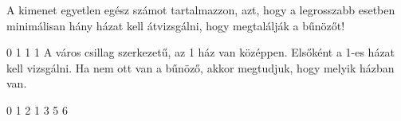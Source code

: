 
A kimenet egyetlen egész számot tartalmazzon, azt, hogy a legrosszabb esetben minimálisan hány házat kell átvizsgálni, hogy megtalálják a bűnözőt!


0 1 1 1
\sampleCOMMENT
A város csillag szerkezetű, az 1 ház van középpen.
\sampleCOMMENT
Elsőként a 1-es házat kell vizsgálni. Ha nem ott van a bűnöző, akkor megtudjuk, hogy melyik házban van.
\sampleEND


\bigskip


0 1 2 1 3 5 6
\sampleEND



